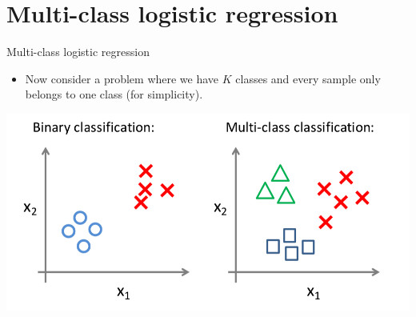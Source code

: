 \documentclass[serif, aspectratio=169]{beamer}
\begin{document}
\section{Multi-class logistic regression}
\begin{frame}{Multi-class logistic regression}
    \begin{itemize}
        \item Now consider a problem where we have $K$ classes and every sample only belongs to one class (for simplicity).
    \end{itemize}
    \centering
    \includegraphics[width=0.8 \linewidth]{pic/multiVsBinaryC.png}
\end{frame}
\end{document}
